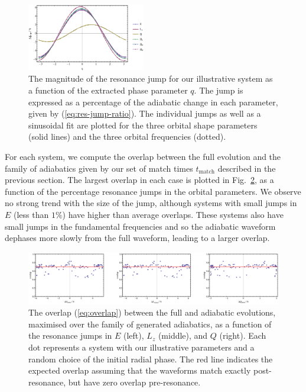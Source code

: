 \documentclass[aps,prd,amsfonts,amssymb,amsmath,nofootinbib,reprint,showpacs,superscriptaddress,twocolumn]{revtex4}
\newcommand{\eqnref}[1]{(\ref{eq:#1})}
\newcommand{\figref}[1]{Fig.\ \ref{fig:#1}}
\begin{document}
\begin{figure}[htbp]
\centering
\includegraphics[width=0.46\textwidth]{Fig_jump_vs_q}
\caption{\label{fig:resjump-vs-q}The magnitude of the resonance jump for our illustrative system as a function of the extracted phase parameter $q$. The jump is expressed as a percentage of the adiabatic change in each parameter, given by \eqnref{res-jump-ratio}. The individual jumps as well as a sinusoidal fit are plotted for the three orbital shape parameters (solid lines) and the three orbital frequencies (dotted).}
\end{figure}

For each system, we compute the overlap between the full evolution and the family of adiabatics given by our set of match times $t_\mathrm{match}$ described in the previous section. The largest overlap in each case is plotted in \figref{overlap-vs-resjump-ill}, as a function of the percentage resonance jumps in the orbital parameters. We observe no strong trend with the size of the jump, although systems with small jumps in $E$ (less than $1\%$) have higher than average overlaps. These systems also have small jumps in the fundamental frequencies and so the adiabatic waveform dephases more slowly from the full waveform, leading to a larger overlap.

\begin{figure}[htbp]
\centering
\includegraphics[width=\textwidth]{Fig_overlap_vs_resjump_ill}
\caption{\label{fig:overlap-vs-resjump-ill}The overlap \eqnref{overlap} between the full and adiabatic evolutions, maximised over the family of generated adiabatics, as a function of the resonance jumps in $E$ (left), $L_z$ (middle), and $Q$ (right). Each dot represents a system with our illustrative parameters and a random choice of the initial radial phase. The red line indicates the expected overlap assuming that the waveforms match exactly post-resonance, but have zero overlap pre-resonance.}
\end{figure}
\end{document}
